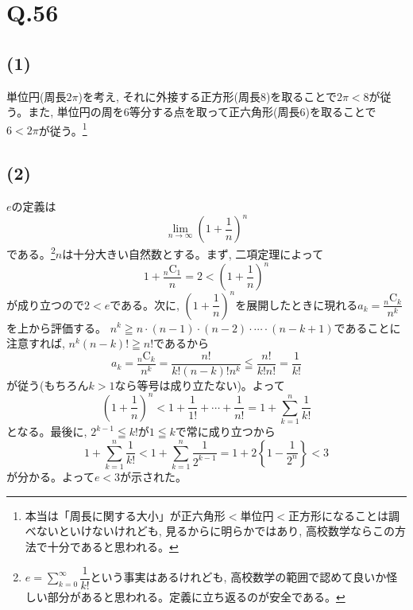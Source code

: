 \documentclass[twocolumn]{jbook}
\newcommand{\disp}{\displaystyle}
\newcommand{\mr}{\mathrm}
\renewcommand{\leq}{\leqq}
\renewcommand{\geq}{\geqq}
\newcommand{\parena}[1]{\left( #1\right)}
\newcommand{\parenb}[1]{\left\{ #1\right\}}
\begin{document}
\section*{Q.56}
\subsection{(1)}
単位円(周長$2\pi$)を考え, それに外接する正方形(周長$8$)を取ることで$2\pi < 8$が従う。また, 単位円の周を6等分する点を取って正六角形(周長$6$)を取ることで$6<2\pi$が従う。\footnote{本当は「周長に関する大小」が正六角形$<$単位円$<$正方形になることは調べないといけないけれども, 見るからに明らかではあり, 高校数学ならこの方法で十分であると思われる。}
\subsection*{(2)}
$e$の定義は
\[\disp\lim_{n\to \infty} \parena{1+\dfrac{1}{n}}^{n}\]
である。\footnote{$e=\disp\sum_{k=0}^{\infty} \dfrac{1}{k!}$という事実はあるけれども, 高校数学の範囲で認めて良いか怪しい部分があると思われる。定義に立ち返るのが安全である。}$n$は十分大きい自然数とする。まず, 二項定理によって
\[1 + \dfrac{{}_{n}\mr{C}_{1}}{n} = 2 < \parena{1+\dfrac{1}{n}}^{n}\]
が成り立つので$2<e$である。次に, $\parena{1+\dfrac{1}{n}}^{n}$を展開したときに現れる$a_k = \dfrac{{}_{n}\mr{C}_{k}}{n^{k}}$を上から評価する。
$n^{k} \geq n\cdot (n-1) \cdot  (n-2) \cdot \cdots  \cdot (n-k+1) $であることに注意すれば, $n^{k} (n-k)! \geq n!$であるから
\[a_k = \dfrac{{}_{n}\mr{C}_{k}}{n^{k}} = \dfrac{n!}{k!(n-k)!n^{k}} \leq \dfrac{n!}{k! n!} = \dfrac{1}{k!}\]
が従う(もちろん$k>1$なら等号は成り立たない)。よって
\[\parena{1+\dfrac{1}{n}}^{n} < 1+\dfrac{1}{1!} + \cdots + \dfrac{1}{n!} =1 +  \disp\sum_{k=1}^{n} \dfrac{1}{k!}\]
となる。最後に, $2^{k-1} \leq k!$が$1\leq k$で常に成り立つから
\[1+\disp\sum_{k=1}^{n} \dfrac{1}{k!} <1+ \disp\sum_{k=1}^{n} \dfrac{1}{2^{k-1}} = 1+2\parenb{1-\dfrac{1}{2^{n}}} < 3\]
が分かる。よって$e<3$が示された。
\end{document}
